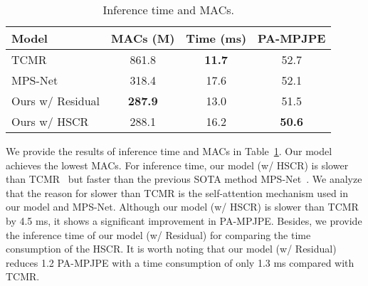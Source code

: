 \documentclass[10pt,twocolumn,letterpaper]{article}
\begin{document}
\begin{table}[htb]
	\small
	\vspace*{-0.75 em}
	\setlength{\tabcolsep}{6 pt}
	\begin{center}
		\begin{tabular}{l | c | c | c }
\toprule[2pt]
			\normalsize
			Model & MACs (M) & Time (ms) & PA-MPJPE\\
			\midrule[1pt]
			TCMR & 861.8 & \textbf{11.7} & 52.7\\
			\cellcolor{Gray}MPS-Net & \cellcolor{Gray}318.4 & \cellcolor{Gray}17.6  & \cellcolor{Gray}52.1\\
			Ours w/ Residual & \textbf{287.9} & 13.0 & 51.5\\
			\cellcolor{Gray}Ours w/ HSCR & \cellcolor{Gray}288.1 & \cellcolor{Gray}16.2 & \cellcolor{Gray}\textbf{50.6}\\
			\bottomrule[1pt]
\end{tabular}
	\end{center}
	\vspace*{-1.5 em}
	\caption{Inference time and MACs.}
	\vspace*{-1. em}
	\label{tab:infer}
\end{table}

We provide the results of inference time and MACs in Table~\ref{tab:infer}. 
Our model achieves the lowest MACs. 
For inference time, our model (w/ HSCR) is slower than TCMR~\cite{TCMR} but faster than the previous SOTA method MPS-Net~\cite{MPS-net}. We analyze that the reason for slower than TCMR is the self-attention mechanism used in our model and MPS-Net.
Although our model (w/ HSCR) is slower than TCMR by 4.5 ms, it shows a significant improvement in PA-MPJPE.
Besides, we provide the inference time of our model (w/ Residual) for comparing the time consumption of the HSCR. 
It is worth noting that our model (w/ Residual) reduces 1.2 PA-MPJPE with a time consumption of only 1.3 ms compared with TCMR.
\end{document}
